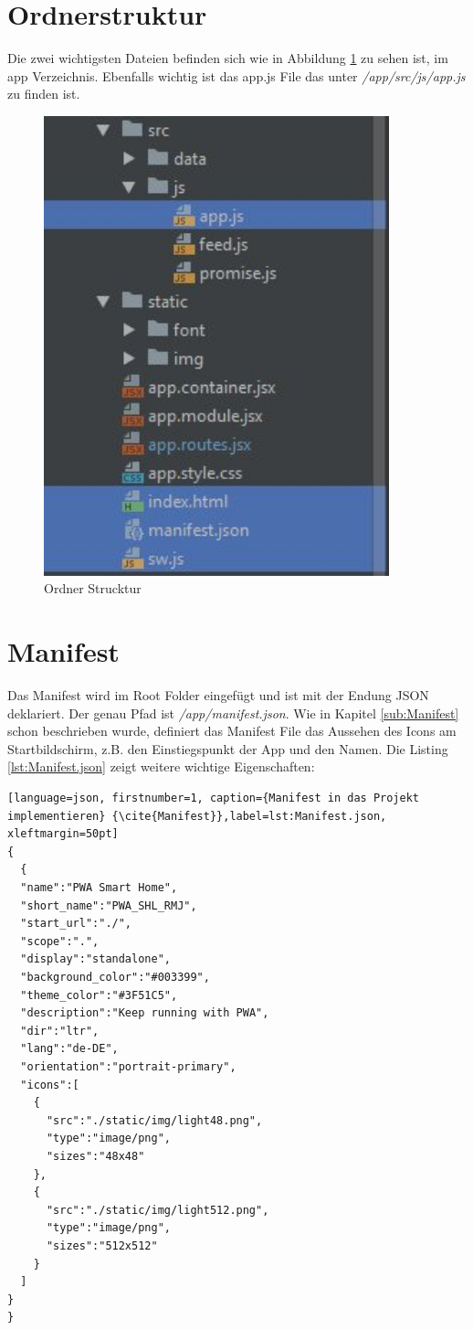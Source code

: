 \section{Ordnerstruktur}
Die zwei wichtigsten Dateien befinden sich wie in Abbildung \ref{fig:OrdnerStrucktur} zu sehen ist, im app Verzeichnis.
Ebenfalls wichtig ist das app.js File das unter \textit{/app/src/js/app.js} zu finden ist.

\begin{figure}[h]
	\centering
	\includegraphics[width=10cm]{BilderAllgemein/Implementierung/OrdnerStrucktur.jpg}\medskip
	\caption{Ordner Strucktur}
	\label{fig:OrdnerStrucktur}
\end{figure} 


\section{Manifest}
Das Manifest wird im Root Folder eingefügt und ist mit der Endung \acs{JSON} deklariert. Der genau Pfad ist \textit{/app/manifest.json}. Wie in Kapitel \ref{sub:Manifest} schon beschrieben wurde, definiert das Manifest File das Aussehen des Icons am Startbildschirm, z.B. den Einstiegspunkt der App und den Namen. 
Die Listing \ref{lst:Manifest.json} zeigt weitere wichtige Eigenschaften:
\newpage
\begin{lstlisting}[language=json, firstnumber=1, caption={Manifest in das Projekt implementieren} {\cite{Manifest}},label=lst:Manifest.json, xleftmargin=50pt]
{
  {
  "name":"PWA Smart Home",
  "short_name":"PWA_SHL_RMJ",
  "start_url":"./",
  "scope":".",
  "display":"standalone",
  "background_color":"#003399",
  "theme_color":"#3F51C5",
  "description":"Keep running with PWA",
  "dir":"ltr",
  "lang":"de-DE",
  "orientation":"portrait-primary",
  "icons":[
    {
      "src":"./static/img/light48.png",
      "type":"image/png",
      "sizes":"48x48"
    },
    {
      "src":"./static/img/light512.png",
      "type":"image/png",
      "sizes":"512x512"
    }
  ]
}
}
\end{lstlisting}

